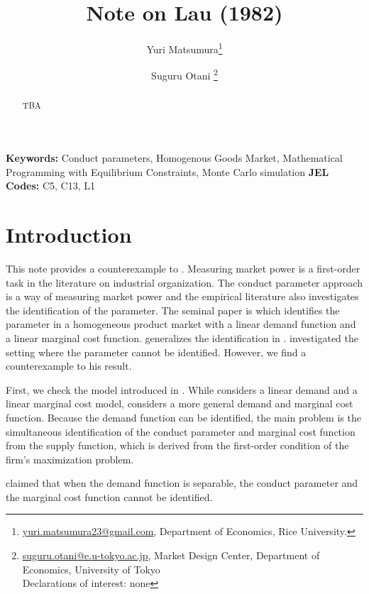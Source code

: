 \documentclass[11pt, a4paper]{article}
\title{Note on Lau (1982)}
\author{Yuri Matsumura\thanks{\href{mailto:}{yuri.matsumura23@gmail.com}, Department of Economics, Rice University.} \and Suguru Otani \thanks{\href{mailto:}{suguru.otani@e.u-tokyo.ac.jp}, Market Design Center, Department of Economics, University of Tokyo
\\Declarations of interest: none %
}}
\theoremstyle{remark}
\begin{document}
\maketitle
\begin{abstract}
    TBA
\end{abstract}

\noindent\textbf{Keywords:} Conduct parameters, Homogenous Goods Market, Mathematical Programming with Equilibrium Constraints, Monte Carlo simulation
\vspace{0in}
\newline
\noindent\textbf{JEL Codes:} C5, C13, L1

\bigskip

\section{Introduction}
This note provides a counterexample to \citet{lau1982identifying}.
Measuring market power is a first-order task in the literature on industrial organization.
The conduct parameter approach is a way of measuring market power and the empirical literature also investigates the identification of the parameter.
The seminal paper is \citet{bresnahan1982oligopoly} which identifies the parameter in a homogeneous product market with a linear demand function and a linear marginal cost function.
\citet{lau1982identifying} generalizes the identification in \citet{bresnahan1982oligopoly}.
\citet{lau1982identifying} investigated the setting where the parameter cannot be identified.
However, we find a counterexample to his result. 

First, we check the model introduced in \citet{lau1982identifying}.
While \citet{bresnahan1982oligopoly} considers a linear demand and a linear marginal cost model, \citet{lau1982identifying} considers a more general demand and marginal cost function.
Because the demand function can be identified, the main problem is the simultaneous identification of the conduct parameter and marginal cost function from the supply function, which is derived from the first-order condition of the firm's maximization problem. 

\citet{lau1982identifying} claimed that when the demand function is separable, the conduct parameter and the marginal cost function cannot be identified.
\end{document}
